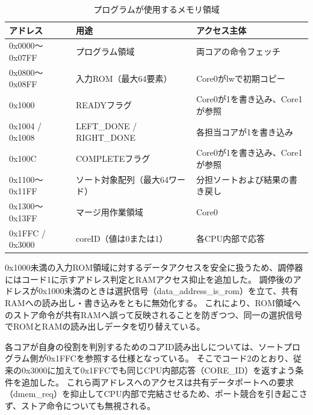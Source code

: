\begin{table}[H]
\centering
\caption{プログラムが使用するメモリ領域}
\label{tab:2}
\footnotesize
\setlength{\tabcolsep}{3pt}
\renewcommand{\arraystretch}{1.25}
\begin{tabular}{>{\raggedright\arraybackslash}p{}>{\raggedright\arraybackslash}p{}>{\raggedright\arraybackslash}p{}}\toprule
\textbf{アドレス} & \textbf{用途} & \textbf{アクセス主体}\\\midrule
0x0000〜0x07FF & プログラム領域 & 両コアの命令フェッチ\\
0x0800〜0x08FF & 入力ROM（最大64要素） & Core0がlwで初期コピー\\
0x1000 & READYフラグ & Core0が1を書き込み、Core1が参照\\
0x1004 / 0x1008 & LEFT\_DONE / RIGHT\_DONE & 各担当コアが1を書き込み\\
0x100C & COMPLETEフラグ & Core0が1を書き込み、Core1が参照\\
0x1100〜0x11FF & ソート対象配列（最大64ワード） & 分担ソートおよび結果の書き戻し\\
0x1300〜0x13FF & マージ用作業領域 & Core0\\
0x1FFC / 0x3000 & coreID（値は0または1） & 各CPU内部で応答\\
\bottomrule\end{tabular}
\end{table}

0x1000未満の入力ROM領域に対するデータアクセスを安全に扱うため、調停器にはコード1に示すアドレス判定とRAMアクセス抑止を追加した。
調停後のアドレスが0x1000未満のときは選択信号（data\_address\_is\_rom）を立て、共有RAMへの読み出し・書き込みをともに無効化する。
これにより、ROM領域へのストア命令が共有RAMへ誤って反映されることを防ぎつつ、同一の選択信号でROMとRAMの読み出しデータを切り替えている。

\par\medskip\noindent\begin{minipage}{\linewidth}
\par\medskip{}\par\nopagebreak

\end{minipage}\par\medskip

各コアが自身の役割を判別するためのコアID読み出しについては、ソートプログラム側が0x1FFCを参照する仕様となっている。
そこでコード2のとおり、従来の0x3000に加えて0x1FFCでも同じCPU内部応答（CORE\_ID）を返すよう条件を追加した。
これら両アドレスへのアクセスは共有データポートへの要求（dmem\_req）を抑止してCPU内部で完結させるため、ポート競合を引き起こさず、ストア命令についても無視される。

